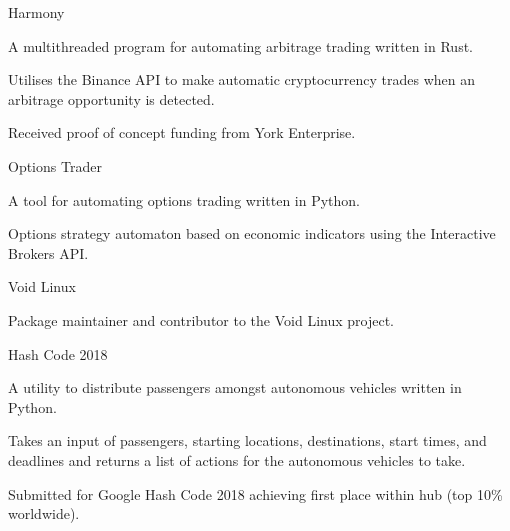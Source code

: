 
\begin{cventries}
  \cventry
    {} %
    {Harmony} %
    {} %
    {} %
    {
      \begin{cvitems} %
        \item {A multithreaded program for automating arbitrage trading written in Rust.}
        \vspace{0.5mm}
		\item {Utilises the Binance API to make automatic cryptocurrency trades when an arbitrage opportunity is detected.}
		\vspace{0.5mm}
		\item {Received proof of concept funding from York Enterprise.}
      \end{cvitems}
    }

  \cventry
    {} %
    {Options Trader} %
    {} %
    {} %
    {
      \begin{cvitems} %
        \item {A tool for automating options trading written in Python.}
        \vspace{0.5mm}
		\item {Options strategy automaton based on economic indicators using the Interactive Brokers API.}
      \end{cvitems}
    }

  \cventry
    {} %
    {Void Linux} %
    {} %
    {} %
    {
      \begin{cvitems} %
      	\item {Package maintainer and contributor to the Void Linux project.}
      \end{cvitems}
    }

  \cventry
    {} %
    {Hash Code 2018} %
    {} %
    {} %
    {
      \begin{cvitems} %
      	\item {A utility to distribute passengers amongst autonomous vehicles written in Python.}
      	\vspace{0.5mm}
		\item {Takes an input of passengers, starting locations, destinations, start times, and deadlines and returns a list of actions for the autonomous vehicles to take.}
		\vspace{0.5mm}
		\item {Submitted for Google Hash Code 2018 achieving first place within hub (top 10\% worldwide).}
      \end{cvitems}
    }
\end{cventries}